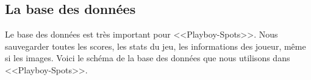 
\subsection{La base des données} %

Le base des données est très important pour <<Playboy-Spots>>. Nous sauvegarder toutes les scores, les stats du jeu, les informations des joueur, même si les images. 
Voici le schéma de la base des données que nous utilisons dans <<Playboy-Spots>>.










